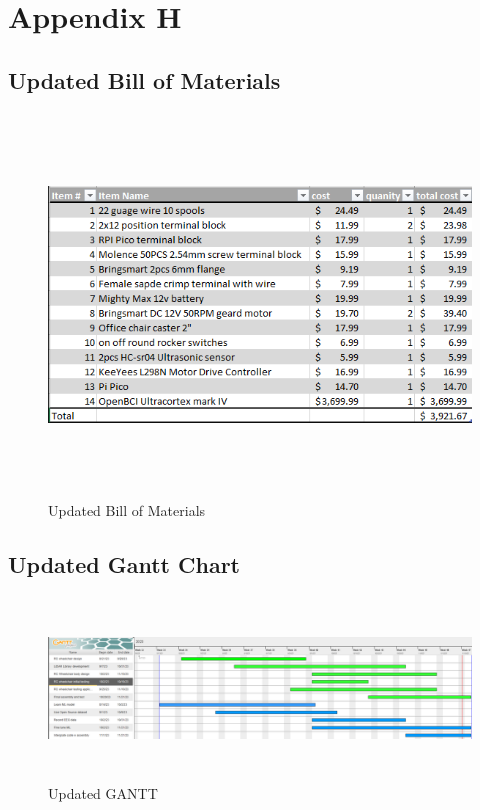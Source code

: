 \documentclass[conference]{IEEEtran}
\begin{document}
\setcounter{section}{8}
\renewcommand{\thesubsection}{H.\Alph{subsection}}
\section*{\textbf{Appendix H}}
        \setcounter{figure}{0}
        \renewcommand{\thefigure}{H.\arabic{figure}}
        \setcounter{table}{0}
        \renewcommand{\thetable}{H.\arabic{table}}
        \setcounter{subsection}{0}

\subsection{Updated Bill of Materials}
\begin{figure}[h]
    \centering
    \includegraphics[keepaspectratio, height=4in]{figs/H/updated_bom.png}
    \caption{Updated Bill of Materials}
    \label{fig:updated_bom}
\end{figure}

\newpage
\subsection{Updated Gantt Chart}
\begin{figure}[h]
    \centering
    \includegraphics[keepaspectratio, height=1.9in, angle=90]{figs/H/updated_gantt.png}
    \caption{Updated GANTT}
    \label{fig:updated_gantt}
\end{figure}
\end{document}
